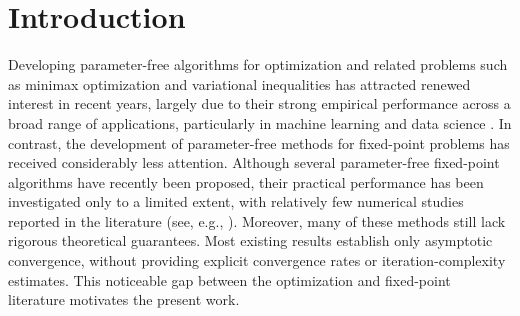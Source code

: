 \documentclass{article}
\theoremstyle{plain}
\theoremstyle{definition}
\newcommand{\0}{\boldsymbol{0}}
\begin{document}
\section{Introduction}\label{sec:intro}
Developing parameter-free algorithms for optimization and related problems such as minimax optimization and variational inequalities has attracted renewed interest in recent years, largely due to their strong empirical performance across a broad range of applications, particularly in machine learning and data science \cite{Barzilai1988,carmon2022making,defazio2022parameter,defazio2023learning,Duchi2011,fercoq2019adaptive,ito2023parameter,KingmaB14,lan2026optimal,li2025simple,malitsky2020adaptive,orabona2016coin}. 
In contrast, the development of parameter-free methods for fixed-point problems has received considerably less attention. 
Although several parameter-free fixed-point algorithms have recently been proposed, their practical performance has been investigated only to a limited extent, with relatively few numerical studies reported in the literature (see, e.g., \cite{alakoya2021modified,diakonikolas2020halpern,lv2026preconditioned,malitsky2020forward,ogwo2025inertial,shen2026parameter,tan2022self}). 
Moreover, many of these methods still lack rigorous theoretical guarantees. 
Most existing results establish only asymptotic convergence, without providing explicit convergence rates or iteration-complexity estimates. 
This noticeable gap between the optimization and fixed-point literature motivates the present work.
\end{document}
